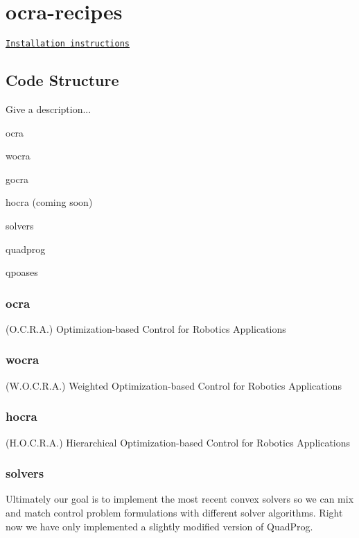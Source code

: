 \section*{ocra-\/recipes}

\href{#Installation}{\tt Installation instructions}

\subsection*{Code Structure}

Give a description...


\begin{DoxyItemize}
\item ocra
\item wocra
\item gocra
\item hocra (coming soon)
\item solvers
\begin{DoxyItemize}
\item quadprog
\item qpoases
\end{DoxyItemize}
\end{DoxyItemize}

\subsubsection*{ocra}

(O.\+C.\+R.\+A.) Optimization-\/based Control for Robotics Applications

\subsubsection*{wocra}

(W.\+O.\+C.\+R.\+A.) Weighted Optimization-\/based Control for Robotics Applications

\subsubsection*{hocra}

(H.\+O.\+C.\+R.\+A.) Hierarchical Optimization-\/based Control for Robotics Applications

\subsubsection*{solvers}

Ultimately our goal is to implement the most recent convex solvers so we can mix and match control problem formulations with different solver algorithms. Right now we have only implemented a slightly modified version of Quad\+Prog.

